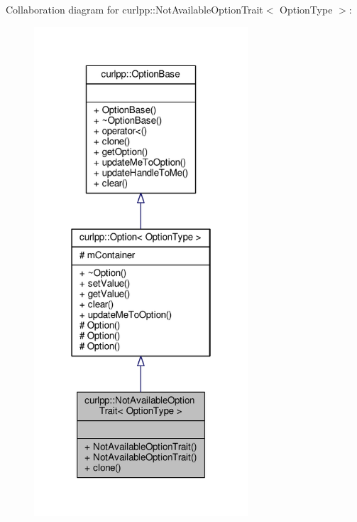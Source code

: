 Collaboration diagram for curlpp\-:\-:Not\-Available\-Option\-Trait$<$ Option\-Type $>$\-:
\nopagebreak
\begin{figure}[H]
\begin{center}
\leavevmode
\includegraphics[width=226pt]{classcurlpp_1_1NotAvailableOptionTrait__coll__graph}
\end{center}
\end{figure}
